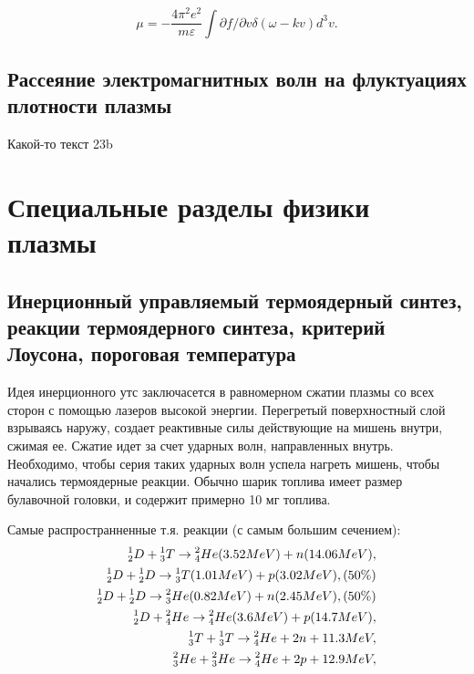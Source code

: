 \documentclass[10pt, a4paper]{article}
\let\stdsection\section
\renewcommand\section{\newpage\stdsection}
\begin{document}
\begin{equation}
    \mu=-\frac{4\pi^2 e^2}{m\varepsilon} \int \partial f/\partial v \delta(\omega-kv) d^3v.
\end{equation}

\subsection{Рассеяние электромагнитных волн на флуктуациях плотности плазмы}

Какой-то текст 23b

\section{Специальные разделы физики плазмы}

\subsection{Инерционный управляемый термоядерный синтез, реакции термоядерного синтеза, критерий Лоусона, пороговая 
температура}
Идея инерционного утс заключасется в равномерном сжатии плазмы со всех сторон с помощью лазеров высокой энергии.
Перегретый поверхностный слой взрываясь наружу, создает реактивные силы действующие на мишень внутри, сжимая ее. Сжатие 
идет за счет ударных волн, направленных внутрь. Необходимо, чтобы серия таких ударных волн успела нагреть мишень, чтобы
начались термоядерные реакции. Обычно шарик топлива имеет размер булавочной головки, и содержит примерно 10 мг топлива.

Самые распространненные т.я. реакции (с самым большим сечением):
\begin{align}
    \prescript{1}{2}{D} + \prescript{1}{3}{T} \rightarrow \prescript{2}{4}{He} (3.52 MeV) + n (14.06 MeV),      \\
    \prescript{1}{2}{D} + \prescript{1}{2}{D} \rightarrow \prescript{1}{3}{T}  (1.01 MeV) + p (3.02 MeV), (50\%) \\
    \prescript{1}{2}{D} + \prescript{1}{2}{D} \rightarrow \prescript{2}{3}{He} (0.82 MeV) + n (2.45 MeV), (50\%) \\
    \prescript{1}{2}{D} + \prescript{2}{4}{He} \rightarrow \prescript{2}{4}{He} (3.6 MeV) + p (14.7 MeV),       \\
    \prescript{1}{3}{T} + \prescript{1}{3}{T} \rightarrow \prescript{2}{4}{He} + 2n + 11.3 MeV,                 \\
    \prescript{2}{3}{He} + \prescript{2}{3}{He} \rightarrow \prescript{2}{4}{He} + 2p + 12.9 MeV,
\end{align}
\end{document}
